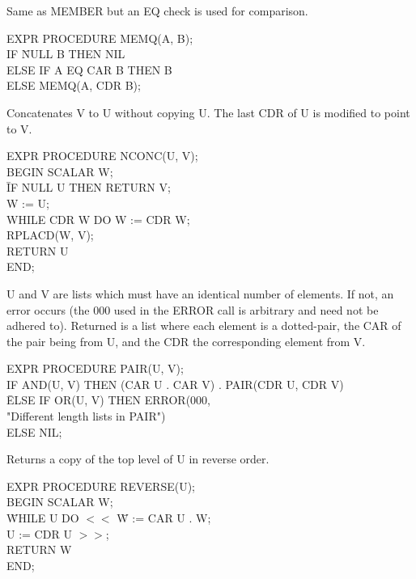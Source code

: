 \documentclass[11pt,letterpaper]{book}
\begin{document}
{Same as MEMBER but an EQ check is used for comparison. 

{\tt \begin{tabbing} EXPR PROCEDURE MEMQ(A, B); \\
\hspace*{1em} IF \= NULL B THEN NIL \\
\> ELSE IF A EQ CAR B THEN B \\
\> ELSE MEMQ(A, CDR B);
\end{tabbing}}}

{Concatenates V to U without copying U. The last CDR of U is modified
to point to V.

{\tt \begin{tabbing} EXPR PROCEDURE NCONC(U, V); \\ BEGIN SCALAR W; \\
\hspace*{2em} \= IF NULL U THEN RETURN V; \\
\> W := U; \\
\> WHILE CDR W DO W := CDR W; \\
\> RPLACD(W, V); \\
\> RETURN U \\
END;
\end{tabbing}}}

{U and V are lists which must have an identical number of elements. If
not, an error occurs (the 000 used in the ERROR call is arbitrary and
need not be adhered to). Returned is a list where each element is a
dotted-pair, the CAR of the pair being from U, and the CDR the
corresponding element from V.

{\tt \begin{tabbing} EXPR PROCEDURE PAIR(U, V); \\
\hspace*{1em} IF AND(U, V) THEN (CAR U . CAR V) . PAIR(CDR U, CDR V) \\
\hspace*{2em} \= ELSE IF OR(U, V) THEN ERROR(000, \\
\hspace*{4em} "Different length lists in PAIR") \\
\> ELSE NIL;
\end{tabbing}}}


{Returns a copy of the top level of U in reverse order.

{\tt \begin{tabbing} EXPR PROCEDURE REVERSE(U); \\ BEGIN SCALAR W; \\
\hspace*{2em} \= WHILE U DO $<<$ \= W := CAR U . W; \\
\> \> U := CDR U $>>$; \\
\>  RETURN W \\
END;
\end{tabbing}}}
\end{document}
